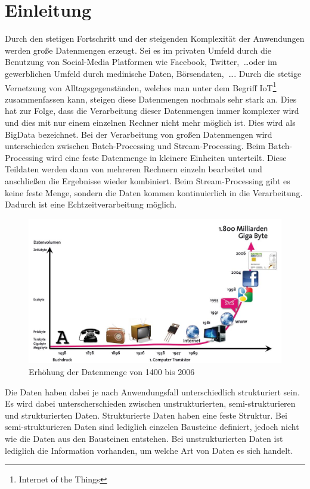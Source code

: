 \chapter{Einleitung}
Durch den stetigen Fortschritt und der steigenden Komplexität der Anwendungen
werden große Datenmengen erzeugt. Sei es im privaten Umfeld durch die Benutzung
von Social-Media Platformen wie Facebook, Twitter,~\dots oder im gewerblichen
Umfeld durch medinische Daten, Börsendaten,~\dots . Durch die stetige Vernetzung
von Alltagsgegenständen, welches man unter dem Begriff IoT\footnote{Internet of the Things}
zusammenfassen kann, steigen diese Datenmengen nochmals sehr stark an. Dies hat
zur Folge, dass die Verarbeitung dieser Datenmengen immer komplexer wird und dies
mit nur einem einzelnen Rechner nicht mehr möglich ist. Dies wird als \gls{BigData}
bezeichnet. Bei der Verarbeitung von großen Datenmengen wird unterschieden
zwischen Batch-Processing und Stream-Processing. Beim Batch-Processing wird eine
feste Datenmenge in kleinere Einheiten unterteilt. Diese Teildaten werden dann
von mehreren Rechnern einzeln bearbeitet und anschließen die Ergebnisse wieder
kombiniert. Beim Stream-Processing gibt es keine feste Menge, sondern die Daten
kommen kontinuierlich in die Verarbeitung. Dadurch ist eine Echtzeitverarbeitung
möglich.

\begin{figure}
\centering
\includegraphics[scale=0.375]{../material/images/bitkom-lf-bigdata-2012-data_grow.jpg}
\caption{Erhöhung der Datenmenge von 1400 bis 2006 \parencite{Weber2012}}
\label{fig:data-grow}
\end{figure}

Die Daten haben dabei je nach Anwendungsfall unterschiedlich strukturiert sein.
Es wird dabei unterscherschieden zwischen unstrukturierten, semi-strukturieren
und strukturierten Daten. Strukturierte Daten haben eine feste Struktur. Bei
semi-strukturieren Daten sind lediglich einzelen Bausteine definiert,
jedoch nicht wie die Daten aus den Bausteinen entstehen. Bei unstrukturierten
Daten ist lediglich die Information vorhanden, um welche Art von Daten es sich
handelt.

